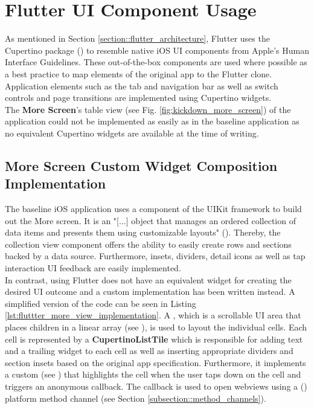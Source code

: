 \section{Flutter UI Component Usage} \label{section::flutter_ui_component_usage}
As mentioned in Section \ref{section::flutter_architecture}, Flutter uses the Cupertino package (\cite{CupertinoPackageDocumentation2021}) to resemble native iOS UI components from Apple's Human Interface Guidelines.
These out-of-the-box components are used where possible as a best practice to map elements of the original app to the Flutter clone. 
Application elements such as the tab and navigation bar as well as switch controls and page transitions are implemented using Cupertino widgets.\\
The \textbf{More Screen}'s table view (see Fig. \ref{fig:kickdown_more_screen}) of the application could not be implemented as easily as in the baseline application as no equivalent Cupertino widgets are available at the time of writing.

\subsection{More Screen Custom Widget Composition Implementation}
The baseline iOS application uses a  component of the UIKit framework to build out the More screen.
It is an "[...] object that manages an ordered collection of data items and presents them using customizable layouts" (\cite{UICollectionView2021}).
Thereby, the collection view component offers the ability to easily create rows and sections backed by a data source. 
Furthermore, insets, dividers, detail icons as well as tap interaction UI feedback are easily implemented.\\
In contrast, using Flutter does not have an equivalent widget for creating the desired UI outcome and a custom implementation has been written instead.
A simplified version of the code can be seen in Listing \ref{lst:fluttter_more_view_implementation}.
A , which is a scrollable UI area that places children in a linear array (see \cite{SliverList2021}), is used to layout the individual cells.
Each cell is represented by a \textbf{CupertinoListTile} which is responsible for adding text and a trailing widget to each cell as well as inserting appropriate dividers and section insets based on the original app specification.
Furthermore, it implements a custom  (see \cite{GestureDetector2021}) that highlights the cell when the user taps down on the cell and triggers an anonymous callback.
The callback is used to open webviews using a  (\cite{SFSafariViewController2021}) platform method channel (see Section \ref{subsection::method_channels}).


